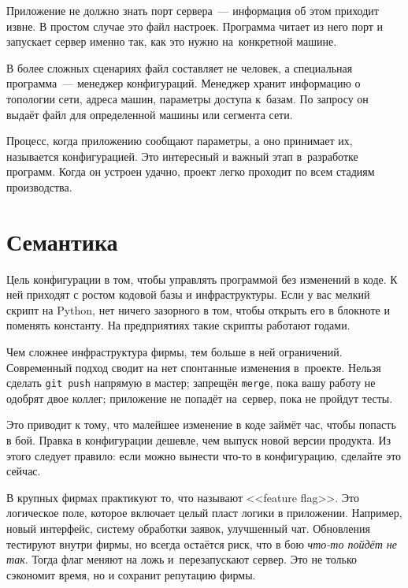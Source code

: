 Приложение не должно знать порт сервера~--- информация об этом приходит извне. В
простом случае это файл настроек. Программа читает из него порт и запускает
сервер именно так, как это нужно на~конкретной машине.


В более сложных сценариях файл составляет не человек, а специальная
программа~--- менеджер конфигураций. Менеджер хранит информацию о топологии
сети, адреса машин, параметры доступа к~базам. По запросу он выдаёт файл для
определенной машины или сегмента сети.

Процесс, когда приложению сообщают параметры, а оно принимает их, называется
конфигурацией. Это интересный и важный этап в~разработке программ. Когда он
устроен удачно, проект легко проходит по всем стадиям производства.

\section{Семантика}

Цель конфигурации в том, чтобы управлять программой без изменений в коде. К ней
приходят с ростом кодовой базы и инфраструктуры. Если у вас мелкий скрипт на
Python, нет ничего зазорного в том, чтобы открыть его в блокноте и поменять
константу. На предприятиях такие скрипты работают годами.

Чем сложнее инфраструктура фирмы, тем больше в ней ограничений. Современный
подход сводит на нет спонтанные изменения в~проекте. Нельзя сделать \verb|git push|
напрямую в мастер; запрещён \verb|merge|, пока вашу работу не одобрят
двое коллег; приложение не попадёт на~сервер, пока не пройдут тесты.

Это приводит к тому, что малейшее изменение в коде займёт час, чтобы попасть в
бой. Правка в конфигурации дешевле, чем выпуск новой версии продукта. Из этого
следует правило: если можно вынести что-то в конфигурацию, сделайте это сейчас.


\label{feature-flags}

В крупных фирмах практикуют то, что называют <<feature flag>>. Это логическое
поле, которое включает целый пласт логики в приложении. Например, новый
интерфейс, систему обработки заявок, улучшенный чат. Обновления тестируют внутри
фирмы, но всегда остаётся риск, что в бою \emph{что-то пойдёт не так}. Тогда
флаг меняют на ложь и~перезапускают сервер. Это не только сэкономит время, но и
сохранит репутацию фирмы.

